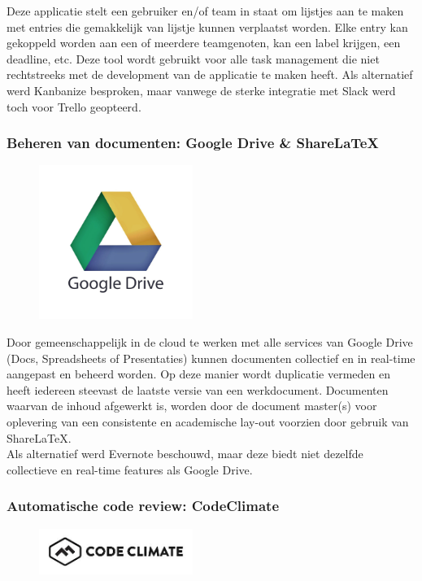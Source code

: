 \documentclass{article}
\begin{document}
\noindent Deze applicatie stelt een gebruiker en/of team in staat om lijstjes aan te maken met entries die gemakkelijk van lijstje kunnen verplaatst worden. Elke entry kan gekoppeld worden aan een of meerdere teamgenoten, kan een label krijgen, een deadline, etc. Deze tool wordt gebruikt voor alle task management die niet rechtstreeks met de development van de applicatie te maken heeft. 
\noindent Als alternatief werd Kanbanize besproken, maar vanwege de sterke integratie met Slack werd toch voor Trello geopteerd.


\clearpage

\subsubsection*{Beheren van documenten: Google Drive \& Share\LaTeX}

\begin{figure}[h!]
\centering
 \includegraphics[width=50mm]{google_drive.jpg}
\end{figure}

\noindent Door gemeenschappelijk in de cloud te werken met alle services van Google Drive (Docs, Spreadsheets of Presentaties) kunnen documenten collectief en in real-time aangepast en beheerd worden. Op deze manier wordt duplicatie vermeden en heeft iedereen steevast de laatste versie van een werkdocument. Documenten waarvan de inhoud afgewerkt is, worden door de document master(s) voor oplevering van een consistente en academische lay-out voorzien door gebruik van Share\LaTeX.\\
Als alternatief werd Evernote beschouwd, maar deze biedt niet dezelfde collectieve en real-time features als Google Drive. 
 
 
 \subsubsection*{Automatische code review: CodeClimate}

\begin{figure}[h!]
\centering
 \includegraphics[width=50mm]{codeClimate.jpg}
\end{figure}
\end{document}
